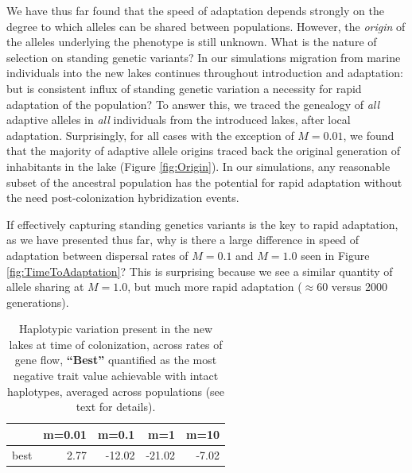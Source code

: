 \documentclass{article}
\begin{document}
We have thus far found that the speed of adaptation depends strongly on the degree to which alleles can be shared between populations. 
However, the \textit{origin} of the alleles underlying the phenotype is still unknown. 
What is the nature of selection on standing genetic variants? 
In our simulations migration from marine individuals into the new lakes continues throughout introduction and adaptation: but is consistent influx of standing genetic variation a necessity for rapid adaptation of the population?
To answer this, we traced the genealogy of \textit{all} adaptive alleles in \textit{all} individuals from the introduced lakes, after local adaptation.
Surprisingly, for all cases with the exception of $M = 0.01$, we found that the majority of adaptive allele origins traced back the original generation of inhabitants in the lake (Figure \ref{fig:Origin}). 
In our simulations,
any reasonable subset of the ancestral population has the potential for rapid adaptation without the need post-colonization hybridization events.

If effectively capturing standing genetics variants is the key to rapid adaptation, as we have presented thus far, why is there a large difference in speed of adaptation between dispersal rates of $M = 0.1$ and $M = 1.0$ seen in Figure \ref{fig:TimeToAdaptation}?
This is surprising because we see a similar quantity of allele sharing at  $M = 1.0$, but much more rapid adaptation ($\approx 60$ versus 2000 generations).

\begin{table}[ht]
    \centering
    \begin{tabular}{rrrrr}
      \hline
     & m=0.01 & m=0.1 & m=1 & m=10 \\ 
      \hline
          best & 2.77 & -12.02 & -21.02 & -7.02 \\ 
       \hline
    \end{tabular}
    \caption{
        Haplotypic variation present in the new lakes at time of colonization,
        across rates of gene flow,
        \textbf{``Best''} 
        quantified as the most negative trait value achievable
        with intact haplotypes, averaged across populations
        (see text for details).
    } \label{tab:linkage}
\end{table}
\end{document}
